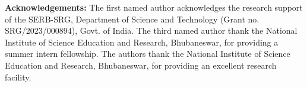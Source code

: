 \documentclass[a4paper,11pt]{amsart}
\numberwithin{equation}{section}
\numberwithin{equation}{subsection}
\begin{document}
%
%

\vspace{1cm}


\noindent\textbf{Acknowledgements:}
The first named author acknowledges the research support of the SERB-SRG, Department of Science and Technology (Grant no. SRG/2023/000894), Govt. of India. The third named author thank the National Institute of Science Education and Research, Bhubaneswar, for providing a summer intern fellowship. The authors thank the National Institute of Science Education and Research, Bhubaneswar, for providing an excellent research facility.
\end{document}
